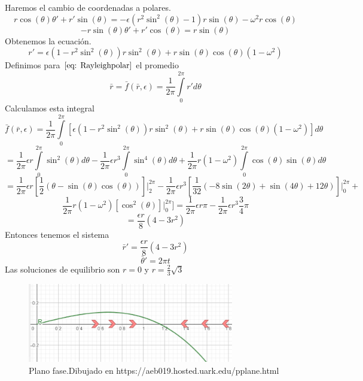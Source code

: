 \documentclass[12pt, a4paper]{report}
\begin{document}
Haremos el cambio de coordenadas a polares.
$$r\cos(\theta)\theta'+r'\sin(\theta)=-\epsilon (r^2\sin^2(\theta)-1)r\sin(\theta)-\omega^2r\cos(\theta) $$
$$-r\sin(\theta)\theta'+r'\cos(\theta)=r\sin(\theta)$$
Obtenemos la ecuación.
\begin{equation}\label{eq: Rayleighpolar}
	r'=\epsilon(1-r^2\sin^2(\theta))r\sin^2(\theta)+r\sin(\theta)\cos(\theta)(1-\omega^2)
\end{equation}
Definimos para $\eqref{eq: Rayleighpolar}$ el promedio
$$\bar{r}=\bar{f}(\bar{r},\epsilon)=\frac{1}{2\pi}\int\limits_0^{2\pi}r'd\theta$$
Calculamos esta integral
$$\bar{f}(\bar{r},\epsilon)=\frac{1}{2\pi}\int\limits_0^{2\pi}[\epsilon(1-r^2\sin^2(\theta))r\sin^2(\theta)+r\sin(\theta)\cos(\theta)(1-\omega^2)]d\theta$$
$$=\frac{1}{2\pi}\epsilon r\int\limits_0^{2\pi}\sin^2(\theta)d\theta-\frac{1}{2\pi}\epsilon r^3\int\limits_0^{2\pi}\sin^4(\theta)d\theta+\frac{1}{2\pi}r(1-\omega^2)\int\limits_0^{2\pi}\cos(\theta)\sin(\theta)d\theta$$
$$=\frac{1}{2\pi}\epsilon r[\frac{1}{2}(\theta-\sin(\theta)\cos(\theta))]\Big|_2^{2\pi}-\frac{1}{2\pi}\epsilon r^3[\frac{1}{32}(-8\sin(2\theta)+\sin(4\theta)+12\theta)]\Big|_0^{2\pi}+$$
$$\frac{1}{2\pi}r(1-\omega^2)[\cos^2(\theta)]\Big|_0^{2\pi}]=\frac{1}{2\pi}\epsilon r\pi-\frac{1}{2\pi}\epsilon r^3\frac{3}{4}\pi$$
$$=\frac{\epsilon r}{8}(4-3r^2)$$
Entonces tenemos el sistema
$$\bar{r}'=\frac{\epsilon r}{8}(4-3r^2)$$
$$\bar{\theta}'=2\pi t$$
Las soluciones de equilibrio son $r=0$ y $r=\frac{2}{3}\sqrt{3}$
\begin{figure}[h]
	\centering
	\includegraphics[width=9cm]{graficarayleigh.png}
	\caption{Plano fase.Dibujado en https://aeb019.hosted.uark.edu/pplane.html}
\end{figure}
\end{document}
